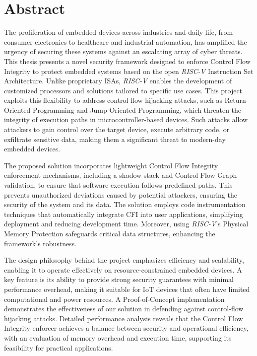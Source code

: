 \chapter*{Abstract}
\label{cha:abstract}

The proliferation of embedded devices across industries and daily life, from consumer
electronics to healthcare and industrial automation, has amplified the urgency
of securing these systems against an escalating array of cyber threats. This thesis
presents a novel security framework designed to enforce Control Flow Integrity to
protect embedded systems based on the open \textit{RISC-V} Instruction Set
Architecture. Unlike proprietary ISAs, \textit{RISC-V} enables the development of
customized processors and solutions tailored to specific use cases. This project
exploits this flexibility to address control flow hijacking attacks, such as Return-Oriented
Programming and Jump-Oriented Programming, which threaten the integrity of
execution paths in microcontroller-based devices. Such attacks allow attackers to
gain control over the target device, execute arbitrary code, or exfiltrate sensitive
data, making them a significant threat to modern-day embedded devices.

The proposed solution incorporates lightweight Control Flow Integrity
enforcement mechanisms, including a shadow stack and Control Flow Graph validation,
to ensure that software execution follows predefined paths. This prevents unauthorized
deviations caused by potential attackers, ensuring the security of the system
and its data. The solution employs code instrumentation techniques that automatically
integrate CFI into user applications, simplifying deployment and reducing
development time. Moreover, using \textit{RISC-V}'s Physical Memory Protection safeguards
critical data structures, enhancing the framework's robustness.

The design philosophy behind the project emphasizes efficiency and scalability, enabling
it to operate effectively on resource-constrained embedded devices. A key
feature is its ability to provide strong security guarantees with minimal
performance overhead, making it suitable for IoT devices that often have limited
computational and power resources. A Proof-of-Concept implementation
demonstrates the effectiveness of our solution in defending against control-flow
hijacking attacks. Detailed performance analysis reveals that the Control Flow Integrity
enforcer achieves a balance between security and operational efficiency, with an
evaluation of memory overhead and execution time, supporting its feasibility for
practical applications.

